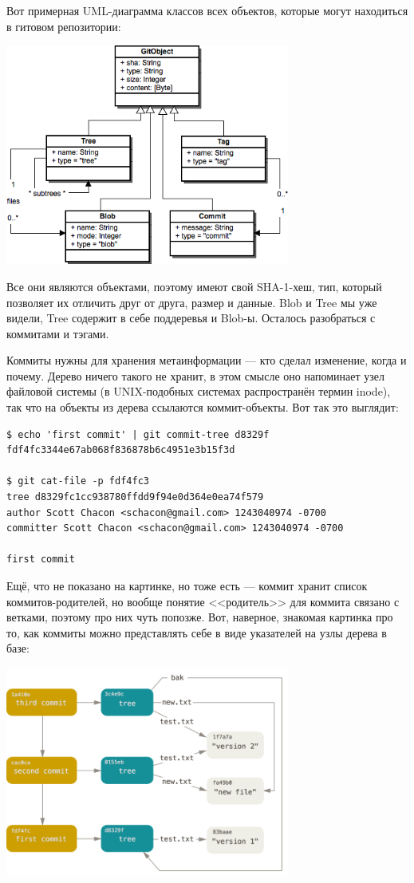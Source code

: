 \documentclass[a5paper]{article}
\begin{document}
Вот примерная UML-диаграмма классов всех объектов, которые могут находиться в гитовом репозитории:
\begin{center}
	\includegraphics[width=0.7\textwidth]{gitDataStructure.png}
\end{center}

Все они являются объектами, поэтому имеют свой SHA-1-хеш, тип, который позволяет их отличить друг от друга, размер и данные. Blob и Tree мы уже видели, Tree содержит в себе поддеревья и Blob-ы. Осталось разобраться с коммитами и тэгами. 

Коммиты нужны для хранения метаинформации --- кто сделал изменение, когда и почему. Дерево ничего такого не хранит, в этом смысле оно напоминает узел файловой системы (в UNIX-подобных системах распространён термин inode), так что на объекты из дерева ссылаются коммит-объекты. Вот так это выглядит:
\begin{verbatim}
$ echo 'first commit' | git commit-tree d8329f
fdf4fc3344e67ab068f836878b6c4951e3b15f3d

$ git cat-file -p fdf4fc3
tree d8329fc1cc938780ffdd9f94e0d364e0ea74f579
author Scott Chacon <schacon@gmail.com> 1243040974 -0700
committer Scott Chacon <schacon@gmail.com> 1243040974 -0700

first commit
\end{verbatim}

Ещё, что не показано на картинке, но тоже есть --- коммит хранит список коммитов-родителей, но вообще понятие <<родитель>> для коммита связано с ветками, поэтому про них чуть попозже. Вот, наверное, знакомая картинка про то, как коммиты можно представлять себе в виде указателей на узлы дерева в базе:

\begin{center}
	\includegraphics[width=0.7\textwidth]{gitCommitObjects.png}
\end{center}
\end{document}
